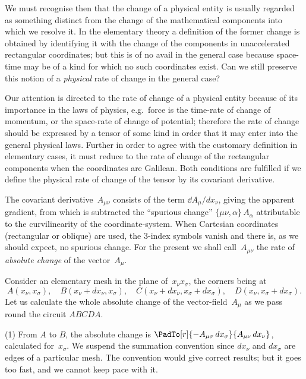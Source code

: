\documentclass[12pt]{book}
\begin{document}
We must recognise then that the change of a physical entity is usually
regarded as something distinct from the change of the mathematical components
into which we resolve it. In the elementary theory a definition of the
former change is obtained by identifying it with the change of the components
in unaccelerated rectangular coordinates; but this is of no avail in the general
case because space-time may be of a kind for which no such coordinates exist.
Can we still preserve this notion of a \emph{physical} rate of change in the general
case?

Our attention is directed to the rate of change of a physical entity because
of its importance in the laws of physics, e.g.\ force is the time-rate of change
of momentum, or the space-rate of change of potential; therefore the rate of
change should be expressed by a tensor of some kind in order that it may enter
into the general physical laws. Further in order to agree with the customary
definition in elementary cases, it must reduce to the rate of change of the
rectangular components when the coordinates are Galilean. Both conditions
are fulfilled if we define the physical rate of change of the tensor by its covariant
derivative.

The covariant derivative~$A_{\mu\nu}$ consists of the term $\dd A_{\mu}/dx_{\nu}$, giving the
apparent gradient, from which is subtracted the ``spurious change'' $\{\mu\nu, \alpha\}\, A_{\alpha}$
attributable to the curvilinearity of the coordinate-system. When Cartesian
coordinates (rectangular or oblique) are used, the $3$-index symbols vanish and
there is, as we should expect, no spurious change. For the present we shall
call~$A_{\mu\nu}$ the rate of \emph{absolute change} of the vector~$A_{\mu}$.
%

Consider an elementary mesh in the plane of~$x_{\nu} x_{\sigma}$, the corners being at
\[
A(x_{\nu}, x_{\sigma}),\quad B(x_{\nu} + dx_{\nu}, x_{\sigma}),\quad
C(x_{\nu} + dx_{\nu}, x_{\sigma} + dx_{\sigma}),\quad D(x_{\nu}, x_{\sigma} + dx_{\sigma}).
\]
Let us calculate the whole absolute change of the vector-field~$A_{\mu}$ as we pass
round the circuit $ABCDA$.

(1) From $A$ to $B$, the absolute change is $\PadTo[r]{-A_{\mu\sigma}\, dx_{\sigma}}{A_{\mu\nu}\, dx_{\nu}}$, calculated for~$x_{\sigma}$\footnotemark.\footnotetext
  {We suspend the summation convention since $dx_{\nu}$ and $dx_{\sigma}$ are edges of a particular mesh.
  The convention would give correct results; but it goes too fast, and we cannot keep pace with it.}%
\end{document}
